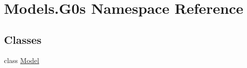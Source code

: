 \hypertarget{namespace_models_1_1_g0s}{\section{Models.\-G0s Namespace Reference}
\label{namespace_models_1_1_g0s}
}
\subsection*{Classes}
\begin{DoxyCompactItemize}
\item 
class \hyperlink{class_models_1_1_g0s_1_1_model}{Model}
\end{DoxyCompactItemize}
